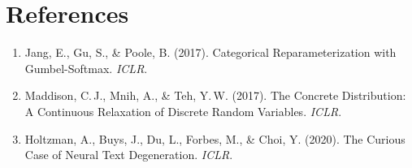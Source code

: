 \documentclass[11pt,a4paper]{article}
\theoremstyle{definition}
\begin{document}
\section*{References}

\begin{enumerate}[noitemsep]
  \item Jang, E., Gu, S., \& Poole, B. (2017). Categorical Reparameterization with Gumbel-Softmax. \textit{ICLR}.
  \item Maddison, C.\,J., Mnih, A., \& Teh, Y.\,W. (2017). The Concrete Distribution: A Continuous Relaxation of Discrete Random Variables. \textit{ICLR}.
  \item Holtzman, A., Buys, J., Du, L., Forbes, M., \& Choi, Y. (2020). The Curious Case of Neural Text Degeneration. \textit{ICLR}.
\end{enumerate}
\end{document}
